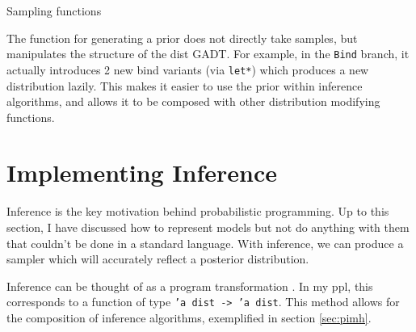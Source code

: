 \begin{listing}[!htb]
	\centering
	\caption{Sampling functions}
	\label{lst:sampling}
\end{listing}
	
The function for generating a prior does not directly take samples, but manipulates the structure of the dist GADT. For example, in the \texttt{Bind} branch, it actually introduces 2 new bind variants (via \texttt{let*}) which produces a new distribution lazily. This makes it easier to use the prior within inference algorithms, and allows it to be composed with other distribution modifying functions.
	
\section{Implementing Inference} \label{sec:inference}

Inference is the key motivation behind probabilistic programming. Up to this section, I have discussed how to represent models but not do anything with them that couldn't be done in a standard language. With inference, we can produce a sampler which will accurately reflect a posterior distribution.
	
Inference can be thought of as a program transformation \cite{scibior2015practical, Zinkov2016ComposingIA}. In my ppl, this corresponds to a function of type \texttt{'a dist -> 'a dist}. This method allows for the composition of inference algorithms, exemplified in section \ref{sec:pimh}.
	
		
		
		
		
